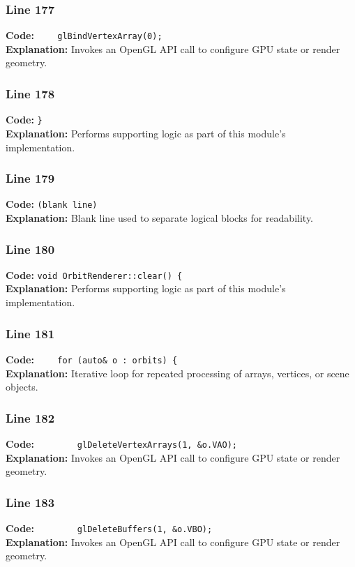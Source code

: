 \documentclass[11pt,a4paper]{article}
\begin{document}
\subsubsection*{Line 177}
\textbf{Code:} \verb|    glBindVertexArray(0);|\\
\textbf{Explanation:} Invokes an OpenGL API call to configure GPU state or render geometry.

\subsubsection*{Line 178}
\textbf{Code:} \verb|}|\\
\textbf{Explanation:} Performs supporting logic as part of this module's implementation.

\subsubsection*{Line 179}
\textbf{Code:} \texttt{(blank line)}\\
\textbf{Explanation:} Blank line used to separate logical blocks for readability.

\subsubsection*{Line 180}
\textbf{Code:} \verb|void OrbitRenderer::clear() {|\\
\textbf{Explanation:} Performs supporting logic as part of this module's implementation.

\subsubsection*{Line 181}
\textbf{Code:} \verb|    for (auto& o : orbits) {|\\
\textbf{Explanation:} Iterative loop for repeated processing of arrays, vertices, or scene objects.

\subsubsection*{Line 182}
\textbf{Code:} \verb|        glDeleteVertexArrays(1, &o.VAO);|\\
\textbf{Explanation:} Invokes an OpenGL API call to configure GPU state or render geometry.

\subsubsection*{Line 183}
\textbf{Code:} \verb|        glDeleteBuffers(1, &o.VBO);|\\
\textbf{Explanation:} Invokes an OpenGL API call to configure GPU state or render geometry.
\end{document}
